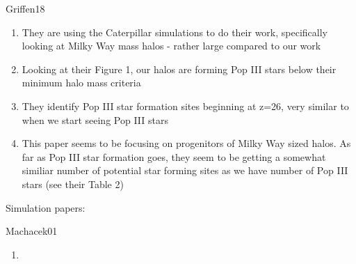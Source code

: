 \documentclass[a4paper,fleqn,usenatbib]{mnras}
\begin{document}
\li Griffen18
\begin{enumerate}
	\item They are using the Caterpillar simulations to do their work, specifically looking at Milky Way mass halos - rather large compared to our work
	\item Looking at their Figure 1, our halos are forming Pop III stars below their minimum halo mass criteria
	\item They identify Pop III star formation sites beginning at z=26, very similar to when we start seeing Pop III stars
	\item This paper seems to be focusing on progenitors of Milky Way sized halos. As far as Pop III star formation goes, they seem to be getting a somewhat similiar number of potential star forming sites as we have number of Pop III stars (see their Table 2)
\end{enumerate}

\li Simulation papers: \citep{Machacek01, Yoshida03, Wise07_UVB,
  OShea08, Muratov13}

\li Machacek01
\begin{enumerate}
	\item
\end{enumerate}
\end{document}
